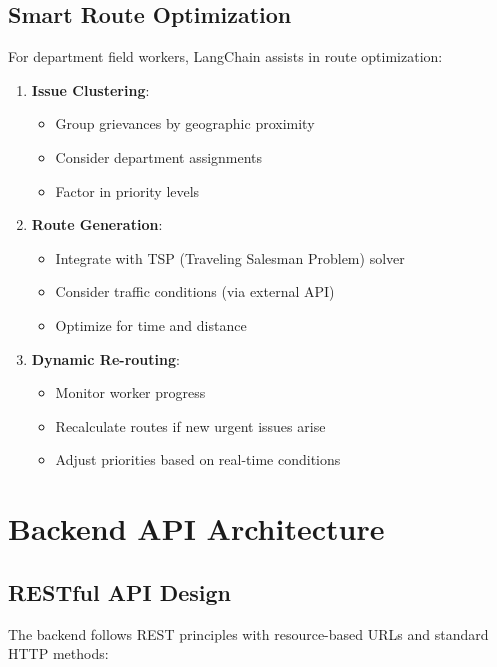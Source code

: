\documentclass[12pt,a4paper]{article}
\begin{document}
\subsection{Smart Route Optimization}

For department field workers, LangChain assists in route optimization:

\begin{enumerate}
    \item \textbf{Issue Clustering}:
    \begin{itemize}
        \item Group grievances by geographic proximity
        \item Consider department assignments
        \item Factor in priority levels
    \end{itemize}
    
    \item \textbf{Route Generation}:
    \begin{itemize}
        \item Integrate with TSP (Traveling Salesman Problem) solver
        \item Consider traffic conditions (via external API)
        \item Optimize for time and distance
    \end{itemize}
    
    \item \textbf{Dynamic Re-routing}:
    \begin{itemize}
        \item Monitor worker progress
        \item Recalculate routes if new urgent issues arise
        \item Adjust priorities based on real-time conditions
    \end{itemize}
\end{enumerate}

\section{Backend API Architecture}

\subsection{RESTful API Design}

The backend follows REST principles with resource-based URLs and standard HTTP methods:
\end{document}
